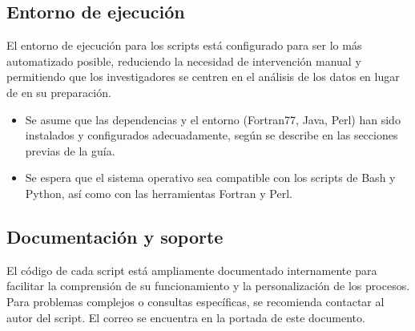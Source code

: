 \documentclass[a4paper,11pt]{refart}
\begin{document}
\subsection{Entorno de ejecución}

El entorno de ejecución para los scripts está configurado para ser lo más automatizado posible, reduciendo la necesidad de intervención manual y permitiendo que los investigadores se centren en el análisis de los datos en lugar de en su preparación.

\begin{itemize}
\item Se asume que las dependencias y el entorno (Fortran77, Java, Perl) han sido instalados y configurados adecuadamente, según se describe en las secciones previas de la guía.
\item Se espera que el sistema operativo sea compatible con los scripts de Bash y Python, así como con las herramientas Fortran y Perl.
\end{itemize}

\subsection{Documentación y soporte}

El código de cada script está ampliamente documentado internamente para facilitar la comprensión de su funcionamiento y la personalización de los procesos. Para problemas complejos o consultas específicas, se recomienda contactar al autor del script. El correo se encuentra en la portada de este documento.



\end{document}
